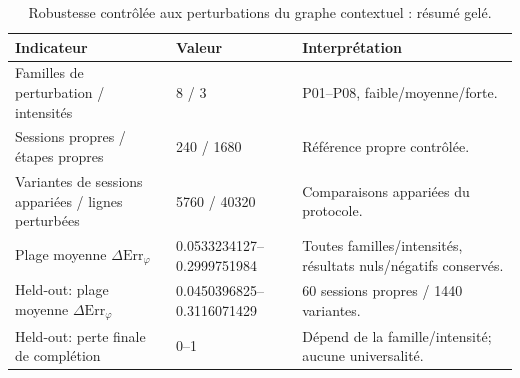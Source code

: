 \begin{table}[t]
\centering
\caption{Robustesse contrôlée aux perturbations du graphe contextuel : résumé gelé.}
\label{tab:v88-ckg-headline}
\small
\begin{tabular}{p{}p{}p{}}
\hline
Indicateur & Valeur & Interprétation \\
\hline
Familles de perturbation / intensités & 8 / 3 & P01--P08, faible/moyenne/forte. \\
Sessions propres / étapes propres & 240 / 1680 & Référence propre contrôlée. \\
Variantes de sessions appariées / lignes perturbées & 5760 / 40320 & Comparaisons appariées du protocole. \\
Plage moyenne $\Delta\mathrm{Err}_\varphi$ & 0.0533234127--0.2999751984 & Toutes familles/intensités, résultats nuls/négatifs conservés. \\
Held-out: plage moyenne $\Delta\mathrm{Err}_\varphi$ & 0.0450396825--0.3116071429 & 60 sessions propres / 1440 variantes. \\
Held-out: perte finale de complétion & 0--1 & Dépend de la famille/intensité; aucune universalité. \\
\hline
\end{tabular}
\end{table}
